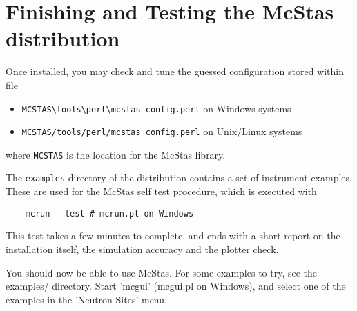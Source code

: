 \section{Finishing and Testing the McStas distribution}
\label{s:testing}

Once installed, you may check and tune the guessed configuration stored within file
\begin{itemize}
\item{\verb+MCSTAS\tools\perl\mcstas_config.perl+ on Windows systems}
\item{\verb+MCSTAS/tools/perl/mcstas_config.perl+ on Unix/Linux systems}
\end{itemize}
where \verb+MCSTAS+ is the location for the McStas library.

The \verb+examples+ directory of the distribution contains a set of instrument examples. These are used for the McStas self test procedure, which is executed with
\begin{verbatim}
    mcrun --test # mcrun.pl on Windows
\end{verbatim}
This test takes a few minutes to complete, and ends with a short report on the installation itself, the simulation accuracy and the plotter check.

You should now be able to use McStas. For some examples to try, see the
examples/ directory. Start 'mcgui' (mcgui.pl on Windows), and select one of the examples in the 'Neutron Sites' menu.
